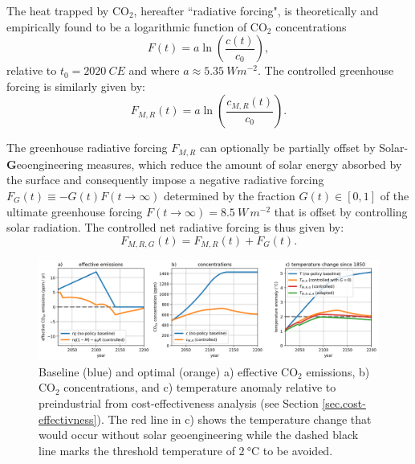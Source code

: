 \documentclass{article}
\begin{document}
The heat trapped by CO$_{2}$, hereafter ``radiative forcing", is theoretically and empirically found to be a logarithmic function of CO$_{2}$ concentrations
\begin{equation}
    F(t) = a \ln(\frac{c(t)}{c_{0}}),
\end{equation}
relative to $t_{0} = \SI{2020}{CE}$ and where $a \approx \SI{5.35}{W m^{-2}}$. The controlled greenhouse forcing is similarly given by:
\begin{equation}
    F_{M, R}(t) = a \ln(\frac{c_{M, R}(t)}{c_{0}}).
\end{equation}

The greenhouse radiative forcing $F_{M, R}$ can optionally be partially offset by Solar-\textbf{G}eoengineering measures, which reduce the amount of solar energy absorbed by the surface and consequently impose a negative radiative forcing $F_{G}(t) \equiv -G(t)F(t \rightarrow \infty)$ determined by the fraction $G(t) \in [0,1]$ of the ultimate greenhouse forcing  $F(t \rightarrow \infty) = \SI{8.5}{W\, m^{-2}}$ that is offset by controlling solar radiation. The controlled net radiative forcing is thus given by:
\begin{equation}
    F_{M, R, G}(t) = F_{M, R}(t) + F_{G}(t).
\end{equation}

\begin{figure}[htb!]
\noindent\includegraphics[width=1.0\textwidth]{figures/default-temp_carbon_and_temperatures.png}
\centering
\caption{Baseline (blue) and optimal (orange) a) effective CO$_{2}$ emissions, b) CO$_{2}$ concentrations, and c) temperature anomaly relative to preindustrial from cost-effectiveness analysis (see Section \ref{sec.cost-effectivness}). The red line in c) shows the temperature change that would occur without solar geoengineering while the dashed black line marks the threshold temperature of $\SI{2}{\celsius}$ to be avoided.}
\label{fig.temp_and_carbon}
\end{figure}
\end{document}
